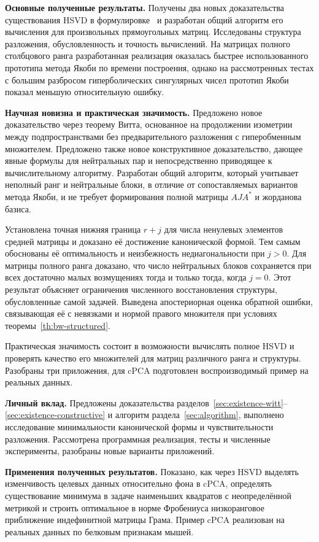 \documentclass[a4paper,12pt]{article}
\theoremstyle{csstyle}
\begin{document}
\textbf{Основные полученные результаты.}
Получены два новых доказательства существования HSVD
в формулировке~\cite{Shirokov} и разработан общий алгоритм
его вычисления для произвольных прямоугольных матриц.
Исследованы структура разложения, обусловленность и точность вычислений.
На матрицах полного столбцового ранга разработанная реализация
оказалась быстрее использованного прототипа метода Якоби по времени построения, однако на рассмотренных тестах с большим
разбросом гиперболических сингулярных чисел прототип Якоби
показал меньшую относительную ошибку.

\textbf{Научная новизна и практическая значимость.}
Предложено новое доказательство через теорему Витта,
основанное на продолжении изометрии между подпространствами
без предварительного разложения с гиперобменным множителем.
Предложено также новое конструктивное доказательство,
дающее явные формулы для нейтральных пар
и непосредственно приводящее к вычислительному алгоритму.
Разработан общий алгоритм, который учитывает неполный ранг
и нейтральные блоки, в отличие от сопоставляемых вариантов метода Якоби,
и не требует формирования полной матрицы $AJA^*$ и жорданова базиса.

Установлена точная нижняя граница $r+j$ для числа ненулевых
элементов средней матрицы и доказано её достижение
канонической формой.
Тем самым обоснованы её оптимальность и неизбежность недиагональности при $j>0$.
Для матрицы полного ранга доказано, что число нейтральных блоков
сохраняется при всех достаточно малых возмущениях тогда и только тогда,
когда $j=0$.
Этот результат объясняет ограничения численного восстановления
структуры, обусловленные самой задачей.
Выведена апостериорная оценка обратной ошибки,
связывающая её с невязками и нормой правого множителя
при условиях теоремы~\ref{th:bw-structured}.

Практическая значимость состоит в возможности вычислять полное HSVD
и проверять качество его множителей для матриц различного ранга и структуры.
Разобраны три приложения, для cPCA подготовлен воспроизводимый пример на реальных данных.

\textbf{Личный вклад.}
Предложены доказательства
разделов~\ref{sec:existence-witt}--\ref{sec:existence-constructive}
и алгоритм раздела~\ref{sec:algorithm}, выполнено исследование
минимальности канонической формы и чувствительности разложения.
Рассмотрена программная реализация, тесты и численные эксперименты, разобраны новые варианты приложений.

\textbf{Применения полученных результатов.}
Показано, как через HSVD выделять изменчивость целевых данных
относительно фона в cPCA, определять существование минимума
в задаче наименьших квадратов с неопределённой метрикой
и строить оптимальное в норме Фробениуса низкоранговое приближение
индефинитной матрицы Грама.
Пример cPCA реализован на реальных данных по белковым признакам мышей.
\end{document}
